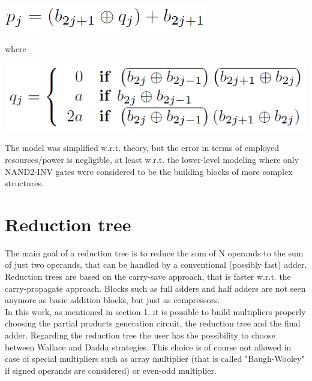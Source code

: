 \documentclass[11pt]{article} %
\begin{document}
\begin{center}
\includegraphics[scale=.42]{form1.PNG}\\
\end{center}
where
\begin{center}
\includegraphics[scale=.42]{form2.PNG}\\
\end{center}
The model was simplified w.r.t. theory, but the error in terms of employed resources/power is negligible, at least w.r.t. the lower-level modeling where only NAND2-INV gates were considered to be the building blocks of more complex structures.




\newpage
\section{Reduction tree}
The main goal of a reduction tree is to reduce the sum of N operands to the sum of just two operands, that can be handled by a conventional (possibly fast) adder. Reduction trees are based on the carry-save approach, that is faster w.r.t. the carry-propagate approach. Blocks such as full adders and half adders are not seen anymore as basic addition blocks, but just as compressors.\\
In this work, as mentioned in section 1, it is possible to build multipliers properly choosing the partial products generation circuit, the reduction tree and the final adder. Regarding the reduction tree the user has the possibility to choose between Wallace and Dadda strategies. This choice is of course not allowed in case of special multipliers such as array multiplier (that is called "Baugh-Wooley" if signed operands are considered) or even-odd multiplier.
\vspace{2em}
\end{document}

